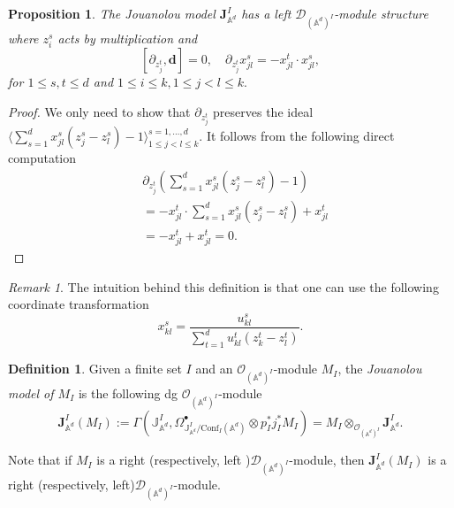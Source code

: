\documentclass[11pt]{amsart}
\newtheorem{prop}[thm]{Proposition}
\theoremstyle{definition}
\newtheorem{defn}[thm]{Definition}
\theoremstyle{remark}
\newtheorem{rem}[thm]{Remark}
\numberwithin{equation}{section}
\begin{document}
\begin{prop}
    The Jouanolou model $\mathbf{J}_{\mathbb{A}^d}^{{I}}$ has a left $\mathcal{D}_{(\mathbb{A}^d)^{{I}}}$-module
    structure where $z^s_i$ acts by multiplication and
    \[
   [\partial_{z^t_j},\mathbf{d}]=0 , \quad \partial_{z^t_j}x^s_{jl}=-x^t_{jl}\cdot x^s_{jl}, 
 \]
for $1\leq s,t\leq d$ and  $1\leq i\leq k, 1\leq j<l\leq k.$
\end{prop}
\begin{proof}
We only need to show that $\partial_{z^t_j}$ preserves the ideal $\langle \sum\limits_{s=1}^dx^s_{jl}(z^s_j-z^s_l)-1\rangle^{s=1,\dots,d}_{1\leq j<l\leq k}$. It follows from the following direct computation
\begin{align*}
   & \partial_{z^t_j} \left(\sum\limits_{s=1}^dx^s_{jl}(z^s_j-z^s_l)-1\right)\\
   & =-x^t_{jl}\cdot\sum\limits_{s=1}^dx^s_{jl}(z^s_j-z^s_l)+x^t_{jl}\\
   &=-x^t_{jl}+x^t_{jl}=0.
\end{align*}

\end{proof}
\begin{rem}
    The intuition behind this definition is that one can use the following coordinate transformation
    $$
    x^s_{kl}=\frac{u^s_{kl}}{\sum\limits^d_{t=1}u^t_{kl}(z^t_k-z^t_l)}.
    $$
\end{rem}

\begin{defn}
Given a finite set ${I}$ and an $\mathcal{O}_{(\mathbb{A}^d)^{{I}}}$-module $M_{{I}}$, the \textit{Jouanolou model of
$M_{{I}}$} is the following dg $\mathcal{O}_{(\mathbb{A}^d)^{{I}}}$-module
\[
\mathbf{J}_{\mathbb{A}^d}^{{I}}(M_{{I}}):=\Gamma\left(\mathbb{J}_{\mathbb{A}^d}^{{I}},\Omega^{\bullet}_{\mathbb{J}_{\mathbb{A}^d}^{{I}}/\mathrm{Conf}_{{I}}(\mathbb{A}^d)}\otimes p^*_{{I}}j^*_{{I}}M_{{I}} \right)=M_{{I}}\otimes_{\mathcal{O}_{(\mathbb{A}^d)^{{I}}}}\mathbf{J}_{\mathbb{A}^d}^{{I}}.
\]

Note that if $M_{{I}}$ is a right (respectively, left )$\mathcal{D}_{(\mathbb{A}^d)^{{I}}}$-module, then $\mathbf{J}
_{\mathbb{A}^d}^{{I}}(M_{{I}})$ is a right (respectively, left)$\mathcal{D}_{(\mathbb{A}^d)^{{I}}}$-module.
\end{defn}
\end{document}
